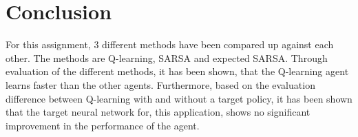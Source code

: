 \chapter{Conclusion} \label{ch:conclusion}

For this assignment, 3 different methods have been compared up against each other. The methods are Q-learning, SARSA and expected SARSA. Through evaluation of the different methods, it has been shown, that the Q-learning agent learns faster than the other agents. Furthermore, based on the evaluation difference between Q-learning with and without a target policy, it has been shown that the target neural network for, this application, shows no significant improvement in the performance of the agent.
 